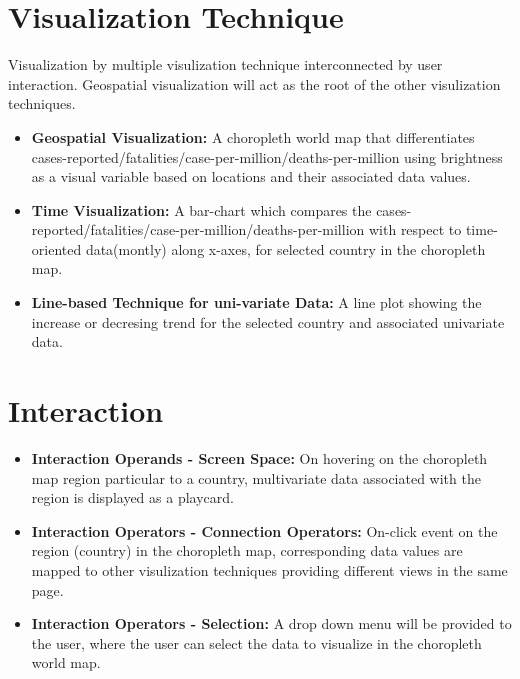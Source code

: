 \documentclass[10pt]{article}
\begin{document}
\section{Visualization Technique}
Visualization by multiple visulization technique interconnected by user interaction. Geospatial visualization will act as the root of the other visulization techniques. 
\begin{itemize}
    \item \textbf{Geospatial Visualization:} A choropleth world map that differentiates cases-reported/fatalities/case-per-million/deaths-per-million using brightness as a visual variable based on locations and their associated data values.
    \item \textbf{Time Visualization:} A bar-chart which compares the cases-reported/fatalities/case-per-million/deaths-per-million with respect to time-oriented data(montly) along x-axes, for selected country in the choropleth map.
     \item \textbf{Line-based Technique for uni-variate Data:} A line plot showing the increase or decresing trend for the selected country and associated univariate data.
\end{itemize}


\section{Interaction}
\begin{itemize}
    \item \textbf{Interaction Operands - Screen Space:} On hovering on the choropleth map region particular to a country, multivariate data associated with the region is displayed as a playcard.
    \item \textbf{Interaction Operators - Connection Operators:} On-click event on the region (country) in the choropleth map, corresponding data values are mapped to other visulization techniques providing different views in the same page.
    \item \textbf{Interaction Operators - Selection:} A drop down menu will be provided to the user, where the user can select the data to visualize in the choropleth world map.
\end{itemize}
\end{document}
